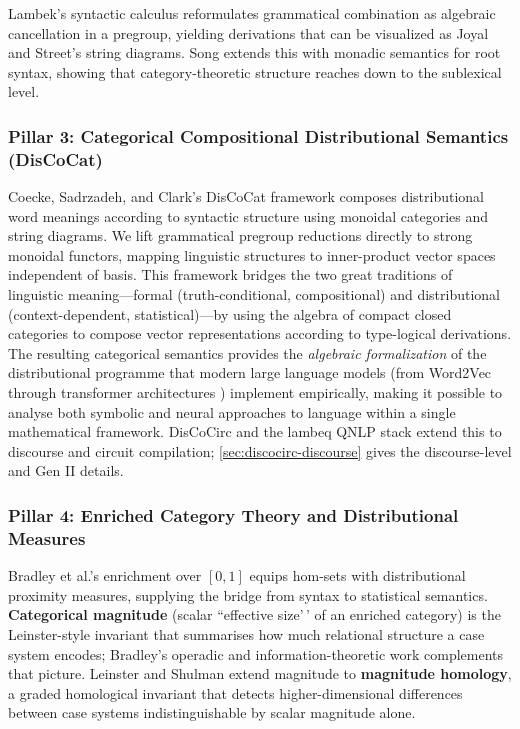 \documentclass[
]{article}
\begin{document}
Lambek's \citeyearpar{lambek1958mathematics} syntactic calculus
reformulates grammatical combination as algebraic cancellation in a
pregroup, yielding derivations that can be visualized as Joyal and
Street's \citeyearpar{joyalstreet1991geometry} string diagrams. Song
\citeyearpar{song2022act} extends this with monadic semantics for root
syntax, showing that category-theoretic structure reaches down to the
sublexical level.

\subsubsection{Pillar 3: Categorical Compositional Distributional
Semantics
(DisCoCat)}\label{pillar-3-categorical-compositional-distributional-semantics-discocat}

Coecke, Sadrzadeh, and Clark's \citeyearpar{coecke2010mathematical}
DisCoCat framework composes distributional word meanings according to
syntactic structure using monoidal categories and string diagrams. We
lift grammatical pregroup reductions directly to strong monoidal
functors, mapping linguistic structures to inner-product vector spaces
independent of basis. This framework bridges the two great traditions of
linguistic meaning---formal (truth-conditional, compositional) and
distributional (context-dependent, statistical)---by using the algebra
of compact closed categories to compose vector representations according
to type-logical derivations. The resulting categorical semantics
provides the \emph{algebraic formalization} of the distributional
programme that modern large language models (from Word2Vec
\citep{mikolov2013efficient} through transformer architectures
\citep{vaswani2017attention, devlin2019bert}) implement empirically,
making it possible to analyse both symbolic and neural approaches to
language within a single mathematical framework. DisCoCirc
\citep{defelice2020discourse, defelice2022discocirc} and the lambeq QNLP
stack \citep{lorenz2021lambeq, quantinuum2025genii} extend this to
discourse and circuit compilation; \autoref{sec:discocirc-discourse}
gives the discourse-level and Gen II details.

\subsubsection{Pillar 4: Enriched Category Theory and Distributional
Measures}\label{pillar-4-enriched-category-theory-and-distributional-measures}

Bradley et al.'s \citeyearpar{fritz2021enriched} enrichment over
\([0,1]\) equips hom-sets with distributional proximity measures,
supplying the bridge from syntax to statistical semantics.
\textbf{Categorical magnitude} (scalar ``effective size'\,' of an
enriched category) is the Leinster-style invariant that summarises how
much relational structure a case system encodes; Bradley's
\citetext{\citeyear{bradley2021entropy}; \citeyear{bradley2024ipam}}
operadic and information-theoretic work complements that picture.
Leinster and Shulman \citeyearpar{leinster2021magnitude} extend
magnitude to \textbf{magnitude homology}, a graded homological invariant
that detects higher-dimensional differences between case systems
indistinguishable by scalar magnitude alone.
\end{document}
